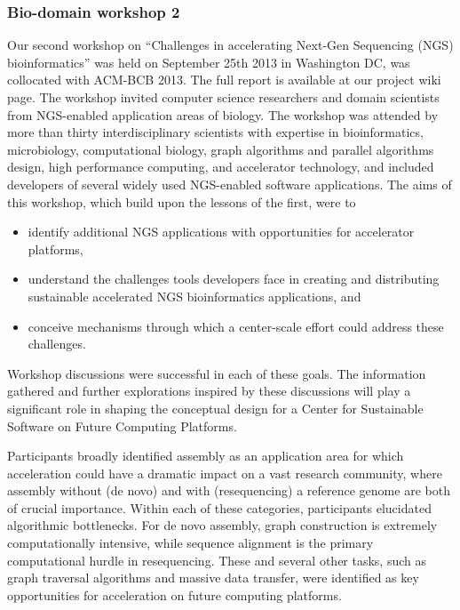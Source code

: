 \subsubsection{Bio-domain workshop 2} Our second workshop on ``Challenges in accelerating Next-Gen Sequencing (NGS) bioinformatics” was held on September 25th 2013 in Washington DC, was collocated with ACM-BCB 2013\cite{acmbcb}. The full report is available at our project wiki page\cite{wiki}. The workshop invited computer science researchers and domain scientists from NGS-enabled application areas of biology. The workshop was attended by more than thirty interdisciplinary scientists with expertise in bioinformatics, microbiology, computational biology, graph algorithms and parallel algorithms design, high performance computing, and accelerator technology, and included developers of several widely used NGS-enabled software applications. The aims of this workshop, which build upon the lessons of the first, were to 
\begin{itemize}
\item	identify additional NGS applications with opportunities for accelerator platforms, 
\item	understand the challenges tools developers face in creating and distributing sustainable accelerated NGS bioinformatics applications, and 
\item	conceive mechanisms through which a center-scale effort could address these challenges.
\end{itemize}

Workshop discussions were successful in each of these goals. The information gathered and further explorations inspired by these discussions will play a significant role in shaping the conceptual design for a Center for Sustainable Software on Future Computing Platforms. 

Participants broadly identified assembly as an application area for which acceleration could have a dramatic impact on a vast research community, where assembly without (de novo) and with (resequencing) a reference genome are both of crucial importance. Within each of these categories, participants elucidated algorithmic bottlenecks. For de novo assembly,  graph construction is extremely computationally intensive, while sequence alignment is the primary computational hurdle in resequencing. These and several other tasks, such as graph traversal algorithms and massive data transfer, were identified as key opportunities for acceleration on future computing platforms.

